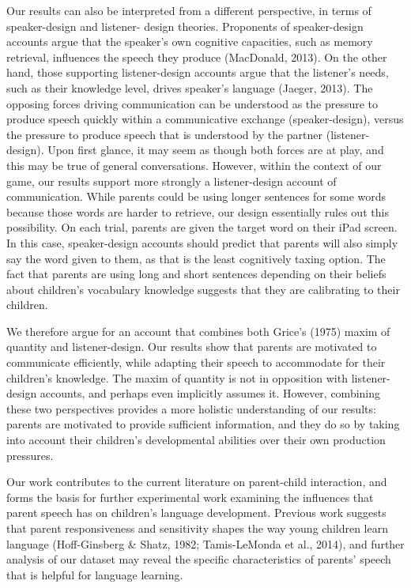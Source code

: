 \documentclass[10pt, letterpaper]{article}
\begin{document}
Our results can also be interpreted from a different perspective, in
terms of speaker-design and listener- design theories. Proponents of
speaker-design accounts argue that the speaker's own cognitive
capacities, such as memory retrieval, influences the speech they produce
(MacDonald, 2013). On the other hand, those supporting listener-design
accounts argue that the listener's needs, such as their knowledge level,
drives speaker's language (Jaeger, 2013). The opposing forces driving
communication can be understood as the pressure to produce speech
quickly within a communicative exchange (speaker-design), versus the
pressure to produce speech that is understood by the partner
(listener-design). Upon first glance, it may seem as though both forces
are at play, and this may be true of general conversations. However,
within the context of our game, our results support more strongly a
listener-design account of communication. While parents could be using
longer sentences for some words because those words are harder to
retrieve, our design essentially rules out this possibility. On each
trial, parents are given the target word on their iPad screen. In this
case, speaker-design accounts should predict that parents will also
simply say the word given to them, as that is the least cognitively
taxing option. The fact that parents are using long and short sentences
depending on their beliefs about children's vocabulary knowledge
suggests that they are calibrating to their children.

We therefore argue for an account that combines both Grice's (1975)
maxim of quantity and listener-design. Our results show that parents are
motivated to communicate efficiently, while adapting their speech to
accommodate for their children's knowledge. The maxim of quantity is not
in opposition with listener- design accounts, and perhaps even
implicitly assumes it. However, combining these two perspectives
provides a more holistic understanding of our results: parents are
motivated to provide sufficient information, and they do so by taking
into account their children's developmental abilities over their own
production pressures.

Our work contributes to the current literature on parent-child
interaction, and forms the basis for further experimental work examining
the influences that parent speech has on children's language
development. Previous work suggests that parent responsiveness and
sensitivity shapes the way young children learn language (Hoff-Ginsberg
\& Shatz, 1982; Tamis-LeMonda et al., 2014), and further analysis of our
dataset may reveal the specific characteristics of parents' speech that
is helpful for language learning.
\end{document}

